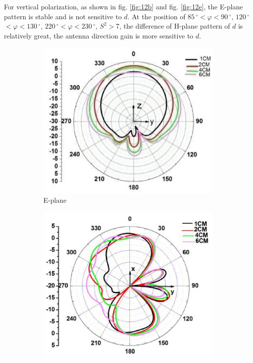 \documentclass[journal]{IEEEtran}
\begin{document}
For vertical polarization, as shown in fig. \ref{fig:12b} and fig. \ref{fig:12e}, the E-plane pattern is stable and is not sensitive to $d$. At the position of $85\,^{\circ}$$<$$\varphi$$<$$90\,^{\circ}$, $120\,^{\circ}$$<$$\varphi$$<$$130\,^{\circ}$, $220\,^{\circ}$$<$$\varphi$$<$$230\,^{\circ}$, $S^{2}$$>$7, the difference of H-plane pattern of $d$ is relatively great, the antenna direction gain is more sensitive to $d$.
\begin{figure}[!htb]
\centering
\begin{subfigure}[b]{0.24\textwidth}
\includegraphics[width=\textwidth]{figs/13a.eps}
\caption{E-plane}
\label{fig:a}	
\end{subfigure}		
\begin{subfigure}[b]{0.24\textwidth}
\includegraphics[width=\textwidth]{figs/13b.eps}

\end{subfigure}
\end{figure}$$
\end{document}
